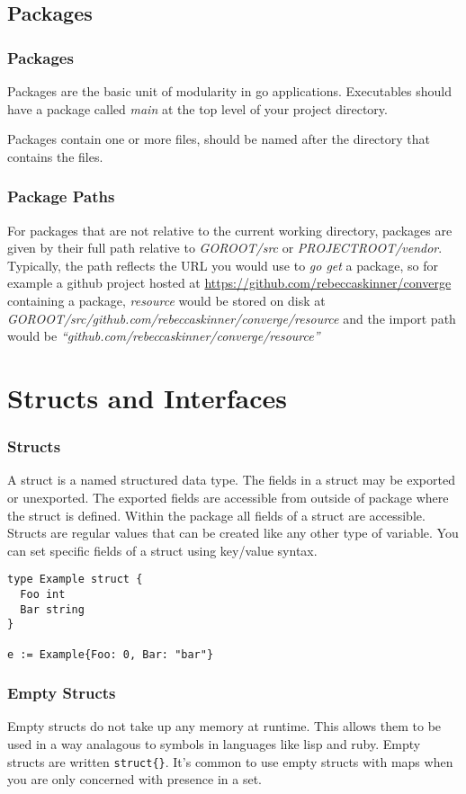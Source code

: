 \documentclass{beamer}
\begin{document}
\subsection{Packages}

\begin{frame}
  \frametitle{Packages}
  Packages are the basic unit of modularity in go applications.
  Executables should have a package called \emph{main} at the top
  level of your project directory.

  Packages contain one or more files, should be named after the
  directory that contains the files.
\end{frame}

\begin{frame}
  \frametitle{Package Paths}
  For packages that are not relative to the current working directory,
  packages are given by their full path relative to \emph{GOROOT/src}
  or \emph{PROJECTROOT/vendor}.  Typically, the path reflects the URL
  you would use to \emph{go get} a package, so for example a github
  project hosted at \url{https://github.com/rebeccaskinner/converge}
  containing a package, \emph{resource} would be stored on disk at
  \emph{GOROOT/src/github.com/rebeccaskinner/converge/resource} and
  the import path would be
  \emph{``github.com/rebeccaskinner/converge/resource''}
\end{frame}

\section{Structs and Interfaces}

\begin{frame}[fragile]
  \frametitle{Structs}
  A struct is a named structured data type.  The fields in a struct
  may be exported or unexported.  The exported fields are accessible
  from outside of package where the struct is defined.  Within the
  package all fields of a struct are accessible.  Structs are regular
  values that can be created like any other type of variable.  You can
  set specific fields of a struct using key/value syntax.

\begin{lstlisting}[language=Golang]
type Example struct {
  Foo int
  Bar string
}

e := Example{Foo: 0, Bar: "bar"}
\end{lstlisting}
\end{frame}

\begin{frame}[fragile]
  \frametitle{Empty Structs}
  Empty structs do not take up any memory at runtime.  This allows
  them to be used in a way analagous to symbols in languages like lisp
  and ruby.  Empty structs are written \verb!struct{}!.  It's common
  to use empty structs with maps when you are only concerned with
  presence in a set.
\end{frame}
\end{document}
